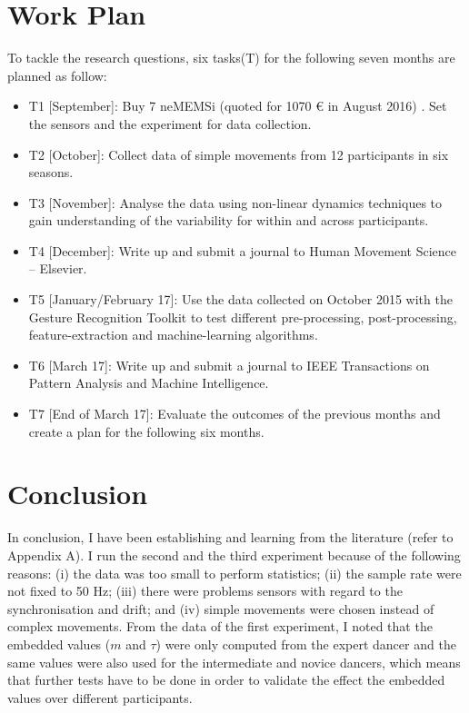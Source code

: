 \documentclass[9pt,journal,onecolumn,compsoc]{IEEEtran}
\begin{document}
\section{Work Plan}
To tackle the research questions,
six tasks(T) for the following seven months are planned as follow:

\begin{itemize}
\item T1 [September]: Buy 7 neMEMSi (quoted for 1070 \euro{} in August 2016) \cite{neMEMSi2016}.
Set the sensors and the experiment  for data collection.

\item T2 [October]: Collect data of simple movements from 12 participants in six seasons.

\item T3 [November]: Analyse the data using non-linear dynamics techniques to gain understanding of the
variability for within and across participants.

\item T4 [December]: Write up and submit a journal to Human Movement Science -- Elsevier.

\item T5 [January/February 17]:
Use the data collected on October 2015 with the Gesture Recognition Toolkit
to test different pre-processing, post-processing, feature-extraction and machine-learning algorithms.

\item T6 [March 17]: Write up and submit a journal to IEEE Transactions on Pattern Analysis and Machine Intelligence.

\item T7 [End of March 17]: Evaluate the outcomes of the previous months and create a plan for the following six months.



\end{itemize}


\section{Conclusion}
In conclusion, I have been establishing and learning
from the literature (refer to Appendix A). I run the second and the third experiment
because of the following reasons:
(i) the data was too small to perform statistics;
(ii) the sample rate were not fixed to 50 Hz;
(iii) there were problems sensors with regard to the synchronisation and drift; and
(iv) simple movements were chosen instead of complex movements.
From the data of the first experiment, I noted that the embedded values ($m$ and $\tau$) were
only computed from the expert dancer and the same values were also used for
the intermediate and novice dancers, which means that further tests have to be done in order to validate the
effect the embedded values over different participants.
\end{document}
